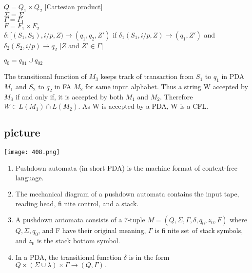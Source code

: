 \documentclass{article}
\begin{document}
\hspace*{2.2cm} $Q = Q_1 \times Q_2$ [Cartesian product]\\
\hspace*{2.2cm} $\Sigma = \Sigma$ \\
\hspace*{2.2cm} $\Gamma = \Gamma_1$ \\
\hspace*{2.2cm} $F = F_1 \times F_2$ \\

\vspace*{0.2cm}
$\delta: [(S_1, S_2), i/p, Z) \rightarrow (q_1, q_2, Z')$ if $\delta_1(S_1,i/p, Z) \rightarrow (q_1, Z')$ and $\delta_2(S_2,i/p) \rightarrow q_2$
\hspace*{0.5cm} $[Z$ and $Z' \in \Gamma]$ \\

 \begin{center}
   $q_0 = q_01 \cup q_02$ \\
 \end{center}

\vspace*{0.2cm}
\hspace*{0.5cm} The transitional function of $M_3$ keeps track of transaction from $S_1$ to $q_1$ in PDA $M_1$ and $S_2$ to $q_2$ in FA
$M_2$ for same input alphabet. Thus a string W accepted by $M_3$ if and only if, it is accepted by both $M_1$ and
$M_2$. Therefore $W \in L(M_1) \cap L(M_2)$. As W is accepted by a PDA, W is a CFL.\\



\begin{center}
\section{picture}
\texttt{[image: 408.png]}
\end{center}

\begin{enumerate}
  \item Pushdown automata (in short PDA) is the machine format of context-free language.\\
  \item The mechanical diagram of a pushdown automata contains the input tape, reading head, fi nite
control, and a stack.\\
  \item A pushdown automata consists of a 7-tuple $M = (Q, \Sigma, \Gamma, \delta, q_0, z_0, F)$ where $Q, \Sigma, q_0$, and F have
their original meaning, $\Gamma$ is fi nite set of stack symbols, and $z_0$ is the stack bottom symbol.\\
  \item In a PDA, the transitional function $\delta$ is in the form $Q \times (\Sigma \cup {\lambda}) \times \Gamma \rightarrow (Q, \Gamma).$ \\
\end{enumerate}
\end{document}
